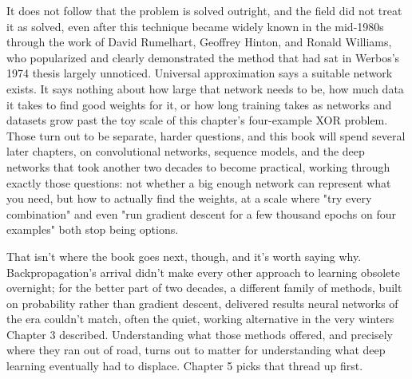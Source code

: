 It does not follow that the problem is solved outright, and the field did not treat it as solved, even after this technique became widely known in the mid-1980s through the work of David Rumelhart, Geoffrey Hinton, and Ronald Williams, who popularized and clearly demonstrated the method that had sat in Werbos's 1974 thesis largely unnoticed. Universal approximation says a suitable network exists. It says nothing about how large that network needs to be, how much data it takes to find good weights for it, or how long training takes as networks and datasets grow past the toy scale of this chapter's four-example XOR problem. Those turn out to be separate, harder questions, and this book will spend several later chapters, on convolutional networks, sequence models, and the deep networks that took another two decades to become practical, working through exactly those questions: not whether a big enough network can represent what you need, but how to actually find the weights, at a scale where "try every combination" and even "run gradient descent for a few thousand epochs on four examples" both stop being options.

That isn't where the book goes next, though, and it's worth saying why. Backpropagation's arrival didn't make every other approach to learning obsolete overnight; for the better part of two decades, a different family of methods, built on probability rather than gradient descent, delivered results neural networks of the era couldn't match, often the quiet, working alternative in the very winters Chapter 3 described. Understanding what those methods offered, and precisely where they ran out of road, turns out to matter for understanding what deep learning eventually had to displace. Chapter 5 picks that thread up first.
